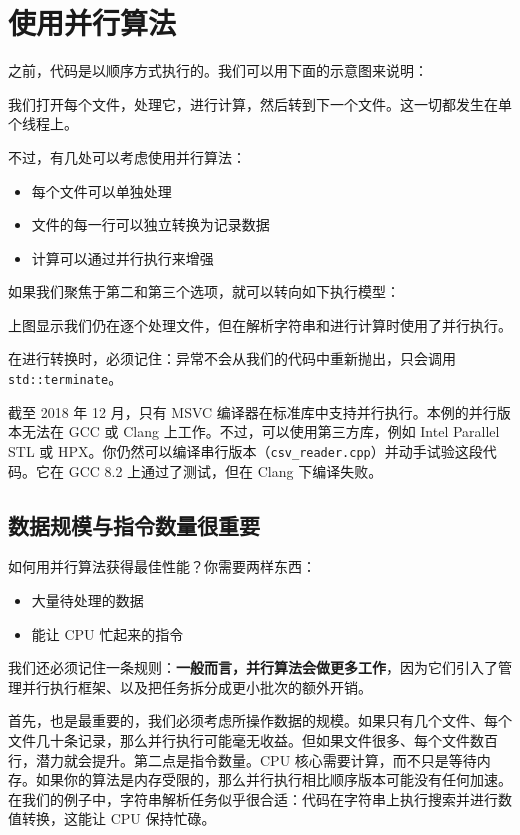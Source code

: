 \section{使用并行算法}

之前，代码是以顺序方式执行的。我们可以用下面的示意图来说明：


我们打开每个文件，处理它，进行计算，然后转到下一个文件。这一切都发生在单个线程上。

不过，有几处可以考虑使用并行算法：
\begin{itemize}
\item 每个文件可以单独处理
\item 文件的每一行可以独立转换为记录数据
\item 计算可以通过并行执行来增强
\end{itemize}

如果我们聚焦于第二和第三个选项，就可以转向如下执行模型：


上图显示我们仍在逐个处理文件，但在解析字符串和进行计算时使用了并行执行。

在进行转换时，必须记住：异常不会从我们的代码中重新抛出，只会调用 \texttt{std::terminate}。

截至 2018 年 12 月，只有 MSVC 编译器在标准库中支持并行执行。本例的并行版本无法在 GCC 或 Clang 上工作。不过，可以使用第三方库，例如 Intel Parallel STL 或 HPX。你仍然可以编译串行版本（\texttt{csv\_reader.cpp}）并动手试验这段代码。它在 GCC 8.2 上通过了测试，但在 Clang 下编译失败。

\subsection{数据规模与指令数量很重要}

如何用并行算法获得最佳性能？你需要两样东西：
\begin{itemize}
\item 大量待处理的数据
\item 能让 CPU 忙起来的指令
\end{itemize}

我们还必须记住一条规则：\textbf{一般而言，并行算法会做更多工作}，因为它们引入了管理并行执行框架、以及把任务拆分成更小批次的额外开销。

首先，也是最重要的，我们必须考虑所操作数据的规模。如果只有几个文件、每个文件几十条记录，那么并行执行可能毫无收益。但如果文件很多、每个文件数百行，潜力就会提升。第二点是指令数量。CPU 核心需要计算，而不只是等待内存。如果你的算法是内存受限的，那么并行执行相比顺序版本可能没有任何加速。在我们的例子中，字符串解析任务似乎很合适：代码在字符串上执行搜索并进行数值转换，这能让 CPU 保持忙碌。

